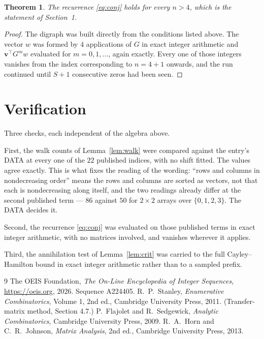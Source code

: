 \documentclass[11pt,a4paper]{article}
\theoremstyle{plain}
\newtheorem{theorem}{Theorem}
\theoremstyle{definition}
\begin{document}
\begin{theorem}
The recurrence \eqref{eq:conj} holds for every $n>4$, which is the statement of
Section~1.
\end{theorem}

\begin{proof}
The digraph was built directly from the conditions listed above. The vector $w$ was formed by
$4$ applications of $G$ in exact integer arithmetic and $\mathbf{v}^{\!\top}G^{m}w$
evaluated for $m=0,1,\dots$, again exactly. Every one of those integers vanishes from the
index corresponding to $n=4+1$ onwards, and the run continued until $S+1$ consecutive
zeros had been seen.
\end{proof}

\section{Verification}

Three checks, each independent of the algebra above.

First, the walk counts of Lemma~\ref{lem:walk} were compared against the entry's DATA at
every one of the $22$ published indices, with no shift fitted. The values agree exactly.
This is what fixes the reading of the wording: ``rows and columns in nondecreasing order''
means the rows and columns are sorted as vectors, not that each is nondecreasing along
itself, and the two readings already differ at the second published term --- $86$ against
$50$ for $2\times2$ arrays over $\{0,1,2,3\}$. The DATA decides it.

Second, the recurrence \eqref{eq:conj} was evaluated on those published terms in exact
integer arithmetic, with no matrices involved, and vanishes wherever it applies.

Third, the annihilation test of Lemma~\ref{lem:crit} was carried to the full
Cayley--Hamilton bound in exact integer arithmetic rather than to a sampled prefix.

\begin{thebibliography}{9}
 The OEIS Foundation, \emph{The On-Line Encyclopedia of Integer
Sequences}, \url{https://oeis.org}, 2026. Sequence A224405.
 R.~P.~Stanley, \emph{Enumerative Combinatorics}, Volume 1, 2nd ed.,
Cambridge University Press, 2011. (Transfer-matrix method, Section 4.7.)
 P.~Flajolet and R.~Sedgewick, \emph{Analytic Combinatorics}, Cambridge
University Press, 2009.
 R.~A.~Horn and C.~R.~Johnson, \emph{Matrix Analysis}, 2nd ed., Cambridge
University Press, 2013.
\end{thebibliography}
\end{document}
